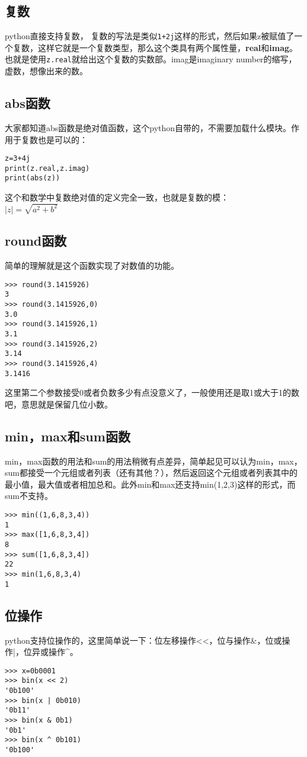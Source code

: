 \documentclass[12pt,oneside]{book}
\begin{document}
\begin{common-format}
\subsection{复数}
python直接支持复数， 复数的写法是类似\verb|1+2j|这样的形式，然后如果z被赋值了一个复数，这样它就是一个复数类型，那么这个类具有两个属性量，\textbf{real}和\textbf{imag}。也就是使用\verb+z.real+就给出这个复数的实数部。imag是imaginary number的缩写，虚数，想像出来的数。

\subsection{abs函数}
大家都知道abs函数是绝对值函数，这个python自带的，不需要加载什么模块。作用于复数也是可以的：
\begin{Verbatim}
z=3+4j
print(z.real,z.imag)
print(abs(z))
\end{Verbatim}

这个和数学中复数绝对值的定义完全一致，也就是复数的模：\\
$ \left| z \right| =\sqrt { a^{ 2 }+b^{ 2 } }  $

\subsection{round函数}
简单的理解就是这个函数实现了对数值的功能。
\begin{Verbatim}
>>> round(3.1415926)
3
>>> round(3.1415926,0)
3.0
>>> round(3.1415926,1)
3.1
>>> round(3.1415926,2)
3.14
>>> round(3.1415926,4)
3.1416
\end{Verbatim}

这里第二个参数接受0或者负数多少有点没意义了，一般使用还是取1或大于1的数吧，意思就是保留几位小数。


\subsection{min，max和sum函数}
\label{sec:sum函数}
min，max函数的用法和sum的用法稍微有点差异，简单起见可以认为min，max，sum都接受一个元组或者列表（还有其他？），然后返回这个元组或者列表其中的最小值，最大值或者相加总和。此外min和max还支持min(1,2,3)这样的形式，而sum不支持。
\begin{Verbatim}
>>> min((1,6,8,3,4))
1
>>> max([1,6,8,3,4])
8
>>> sum([1,6,8,3,4])
22
>>> min(1,6,8,3,4)
1
\end{Verbatim}



\subsection{位操作}
python支持位操作的，这里简单说一下：位左移操作<<，位与操作\&{}，位或操作|，位异或操作\^{}。
\begin{Verbatim}
>>> x=0b0001
>>> bin(x << 2)
'0b100'
>>> bin(x | 0b010)
'0b11'
>>> bin(x & 0b1)
'0b1'
>>> bin(x ^ 0b101)
'0b100'
\end{Verbatim}





\end{common-format}
\end{document}
